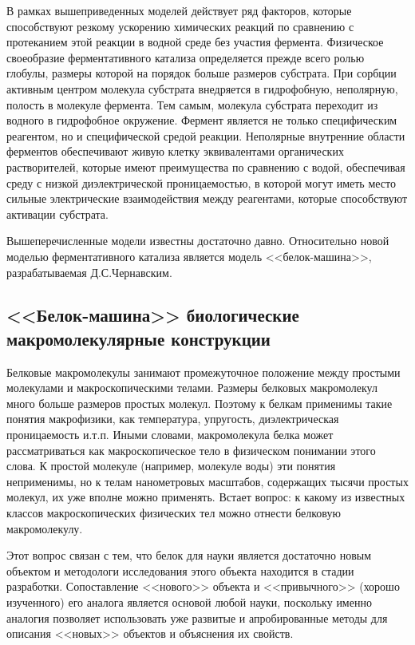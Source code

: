 \documentclass[12pt,a4paper,oneside]{book}
\begin{document}
В рамках вышеприведенных моделей действует ряд факторов, которые способствуют резкому ускорению химических реакций по сравнению с протеканием этой реакции в водной среде без участия фермента. Физическое своеобразие ферментативного катализа определяется прежде всего ролью глобулы, размеры которой на порядок больше размеров субстрата. При сорбции активным центром молекула субстрата внедряется в гидрофобную, неполярную, полость в молекуле фермента. Тем самым, молекула субстрата переходит из водного в гидрофобное окружение. Фермент является не только специфическим реагентом, но и специфической средой реакции. Неполярные внутренние области ферментов обеспечивают живую клетку эквивалентами органических растворителей, которые имеют преимущества по сравнению с водой, обеспечивая среду с низкой диэлектрической проницаемостью, в которой могут иметь место сильные электрические взаимодействия между реагентами, которые способствуют активации субстрата.  

Вышеперечисленные модели известны достаточно давно. Относительно новой моделью ферментативного катализа является модель <<белок-машина>>, разрабатываемая Д.С.Чернавским. 

\subsection{<<Белок-машина>> биологические макромолекулярные конструкции}

Белковые макромолекулы занимают промежуточное положение между простыми молекулами и макроскопическими телами. Размеры белковых макромолекул много больше размеров простых молекул. Поэтому к белкам применимы такие понятия макрофизики, как температура, упругость, диэлектрическая проницаемость и.т.п. Иными словами, макромолекула белка может рассматриваться как макроскопическое тело в физическом понимании этого слова. К простой молекуле (например, молекуле воды) эти понятия неприменимы, но к телам нанометровых масштабов, содержащих тысячи простых молекул, их уже вполне можно применять.   Встает вопрос: к какому из известных классов макроскопических физических тел можно отнести белковую макромолекулу. 

Этот вопрос связан с тем, что белок для науки является достаточно новым объектом и методологи исследования этого объекта находится в стадии разработки.  Сопоставление <<нового>> объекта и <<привычного>> (хорошо изученного) его аналога является основой любой науки, поскольку именно аналогия позволяет использовать уже развитые и апробированные методы для описания <<новых>> объектов и объяснения их свойств. 
\end{document}
